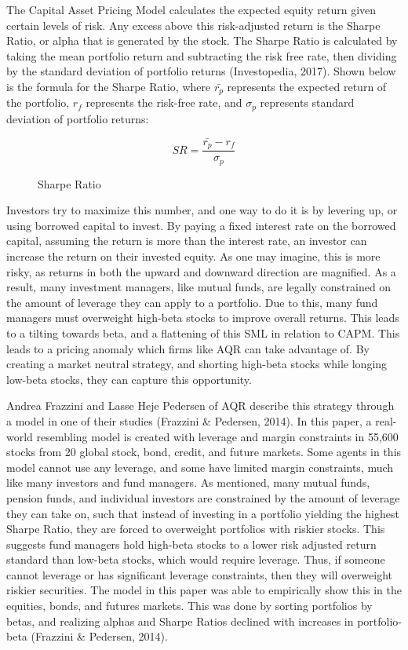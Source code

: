 \documentclass[12pt,twoside]{reedthesis}
\theoremstyle{definition}
\theoremstyle{definition}
\theoremstyle{definition}
\theoremstyle{remark}
\begin{document}
The Capital Asset Pricing Model calculates the expected equity return
given certain levels of risk. Any excess above this risk-adjusted return
is the Sharpe Ratio, or alpha that is generated by the stock. The Sharpe
Ratio is calculated by taking the mean portfolio return and subtracting
the risk free rate, then dividing by the standard deviation of portfolio
returns (Investopedia, 2017). Shown below is the formula for the Sharpe
Ratio, where \(\bar{r_p}\) represents the expected return of the
portfolio, \(r_f\) represents the risk-free rate, and \(\sigma_p\)
represents standard deviation of portfolio returns:
\begin{figure}
$$ SR = \frac{\bar{r_p}-r_f} {\sigma_p} $$
\caption{Sharpe Ratio}
\end{figure}
Investors try to maximize this number, and one way to do it is by
levering up, or using borrowed capital to invest. By paying a fixed
interest rate on the borrowed capital, assuming the return is more than
the interest rate, an investor can increase the return on their invested
equity. As one may imagine, this is more risky, as returns in both the
upward and downward direction are magnified. As a result, many
investment managers, like mutual funds, are legally constrained on the
amount of leverage they can apply to a portfolio. Due to this, many fund
managers must overweight high-beta stocks to improve overall returns.
This leads to a tilting towards beta, and a flattening of this SML in
relation to CAPM. This leads to a pricing anomaly which firms like AQR
can take advantage of. By creating a market neutral strategy, and
shorting high-beta stocks while longing low-beta stocks, they can
capture this opportunity.

Andrea Frazzini and Lasse Heje Pedersen of AQR describe this strategy
through a model in one of their studies (Frazzini \& Pedersen, 2014). In
this paper, a real-world resembling model is created with leverage and
margin constraints in 55,600 stocks from 20 global stock, bond, credit,
and future markets. Some agents in this model cannot use any leverage,
and some have limited margin constraints, much like many investors and
fund managers. As mentioned, many mutual funds, pension funds, and
individual investors are constrained by the amount of leverage they can
take on, such that instead of investing in a portfolio yielding the
highest Sharpe Ratio, they are forced to overweight portfolios with
riskier stocks. This suggests fund managers hold high-beta stocks to a
lower risk adjusted return standard than low-beta stocks, which would
require leverage. Thus, if someone cannot leverage or has significant
leverage constraints, then they will overweight riskier securities. The
model in this paper was able to empirically show this in the equities,
bonds, and futures markets. This was done by sorting portfolios by
betas, and realizing alphas and Sharpe Ratios declined with increases in
portfolio-beta (Frazzini \& Pedersen, 2014).
\end{document}
